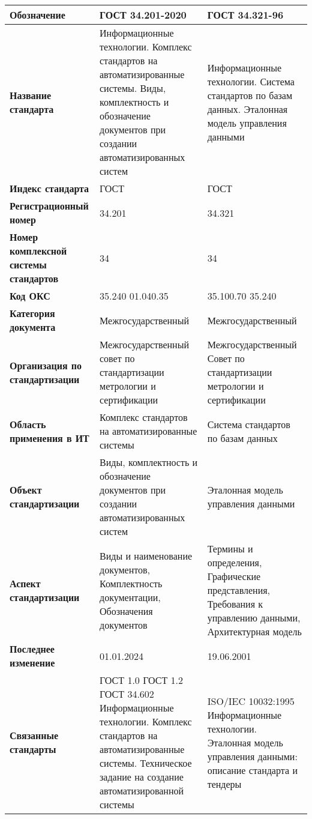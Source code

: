 \begin{table}[h!tp]
	\small
	\centering
	\caption{}
	\label{table:interstate}
	\begin{tabular}{|p{10em}|p{14em}|p{14em}|}
		\hline
		\textbf{Обозначение}
			& \textbf{ГОСТ 34.201-2020} & \textbf{ГОСТ 34.321-96} \\ \hline
		\textbf{Название стандарта}
			& Информационные технологии. Комплекс стандартов на автоматизированные системы. Виды, комплектность и обозначение документов при создании автоматизированных систем
			& Информационные технологии. Система стандартов по базам данных. Эталонная модель управления данными \\ \hline
		\textbf{Индекс стандарта} & ГОСТ & ГОСТ \\ \hline
		\textbf{Регистрационный номер} & 34.201 & 34.321 \\ \hline
		\textbf{Номер комплексной системы стандартов} & 34 & 34 \\ \hline
		\textbf{Код ОКС} & 35.240 01.040.35 & 35.100.70 35.240 \\ \hline
		\textbf{Категория документа}
			& Межгосударственный & Межгосударственный \\ \hline
		\textbf{Организация по стандартизации}
			& Межгосударственный совет по стандартизации метрологии и сертификации
			& Межгосударственный Совет по стандартизации метрологии и сертификации \\ \hline
		\textbf{Область применения в ИТ}
			& Комплекс стандартов на автоматизированные системы
			& Система стандартов по базам данных \\ \hline
		\textbf{Объект стандартизации}
			& Виды, комплектность и обозначение документов при создании автоматизированных систем
			& Эталонная модель управления данными \\ \hline
		\textbf{Аспект стандартизации}
			& Виды и наименование документов, Комплектность документации, Обозначения документов
			& Термины и определения, Графические представления, Требования к управлению данными, Архитектурная модель \\ \hline
		\textbf{Последнее изменение} & 01.01.2024 & 19.06.2001 \\ \hline
		\textbf{Связанные стандарты}
			& ГОСТ 1.0  ГОСТ 1.2  ГОСТ 34.602 	Информационные технологии. Комплекс стандартов на автоматизированные системы. Техническое задание на создание автоматизированной системы
			& ISO/IEC 10032:1995 Информационные технологии. Эталонная модель управления данными: описание стандарта и тендеры \\ \hline
	\end{tabular}
\end{table}

